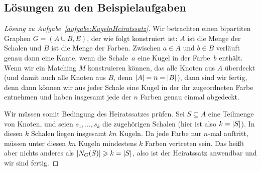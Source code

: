 
\subsection*{Lösungen zu den Beispielaufgaben}

\begin{proof}[Lösung zu Aufgabe~\ref{aufgabe:KugelnHeiratssatz}]
	Wir betrachten einen bipartiten Graphen $G=(A\cup B,E)$, der wie folgt konstruiert ist: $A$ ist die Menge der Schalen und $B$ ist die Menge der Farben. Zwischen $a\in A$ und $b\in B$ verläuft genau dann eine Kante, wenn die Schale~$a$ eine Kugel in der Farbe~$b$  enthält. Wenn wir ein Matching $M$ konstruieren können, das alle Knoten aus $A$ überdeckt (und damit auch alle Knoten aus $B$, denn $\lvert A\rvert=n=\lvert B\rvert$), dann sind wir fertig, denn dann können wir aus jeder Schale eine Kugel in der ihr zugeordneten Farbe entnehmen und haben insgesamt jede der $n$ Farben genau einmal abgedeckt.
	
	Wir müssen somit Bedingung des Heiratssatzes prüfen. Sei $S\subseteq A$ eine Teilmenge von Knoten, und seien $s_1,\dotsc,s_k$ die zugehörigen Schalen (hier ist also $k=\lvert S\rvert$). In diesen $k$ Schalen liegen insgesamt $kn$ Kugeln. Da jede Farbe nur $n$-mal auftritt, müssen unter diesen $kn$ Kugeln mindestens $k$ Farben vertreten sein. Das heißt aber nichts anderes als $\lvert N_G(S)\rvert\geqslant k=\lvert S\rvert$, also ist der Heiratssatz anwendbar und wir sind fertig.
\end{proof}

